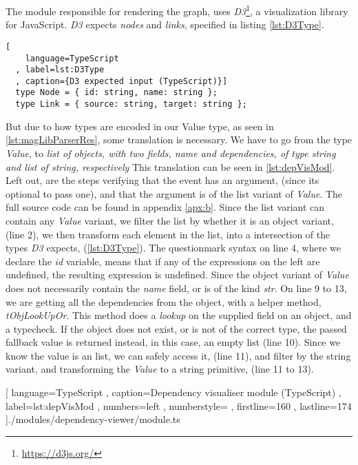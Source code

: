 The module responsible for rendering the graph, uses
\textit{D3}\footnote{\url{https://d3js.org/}}, a visualization library for
JavaScript. \textit{D3} expects \textit{nodes} and \textit{links}, specified in
listing \ref{lst:D3Type}.

\begin{lstlisting}[
    language=TypeScript
  , label=lst:D3Type
  , caption={D3 expected input (TypeScript)}]
  type Node = { id: string, name: string };
  type Link = { source: string, target: string };
\end{lstlisting}

But due to how types are encoded in our Value type, as seen in
\ref{lst:magLibParserRes}, some translation is necessary. We have to go from the
type \textit{Value}, to
\textit{
  list of objects, with two fields, name and dependencies, of type string and
  list of string, respectively}
This translation can be seen in \ref{lst:depVisMod}. Left out, are the steps
verifying that the event has an argument, (since its optional to pass one), and
that the argument is of the list variant of \textit{Value}. The full source code
can be found in appendix \ref{apx:b}. Since the list variant can contain any
\textit{Value} variant, we filter the list by whether it is an object variant,
(line 2), we then transform each element in the list, into a intersection of the
types \textit{D3} expects, (\ref{lst:D3Type}). The questionmark syntax on line
4, where we declare the \textit{id} variable, means that if any of the
expressions on the left are undefined, the resulting expression is undefined.
Since the object variant of \textit{Value} does not necessarily contain the
\textit{name} field, or is of the kind \textit{str}. On line 9 to 13, we are
getting all the dependencies from the object, with a helper method,
\textit{tObjLookUpOr}. This method does a \textit{lookup} on the supplied field
on an object, and a typecheck. If the object does not exist, or is not of the
correct type, the passed fallback value is returned instead, in this case, an
empty list (line 10). Since we know the value is an list, we can safely access
it, (line 11), and filter by the string variant, and transforming the
\textit{Value} to a string primitive, (line 11 to 13).

\begin{code}[H]
  
    [ language=TypeScript
    , caption={Dependency visualiser module (TypeScript)}
    , label=lst:depVisMod
    , numbers=left
    , numberstyle=\tiny\color{gray}
    , firstline=160
    , lastline=174
    ]{./modules/dependency-viewer/module.ts}
\end{code}

